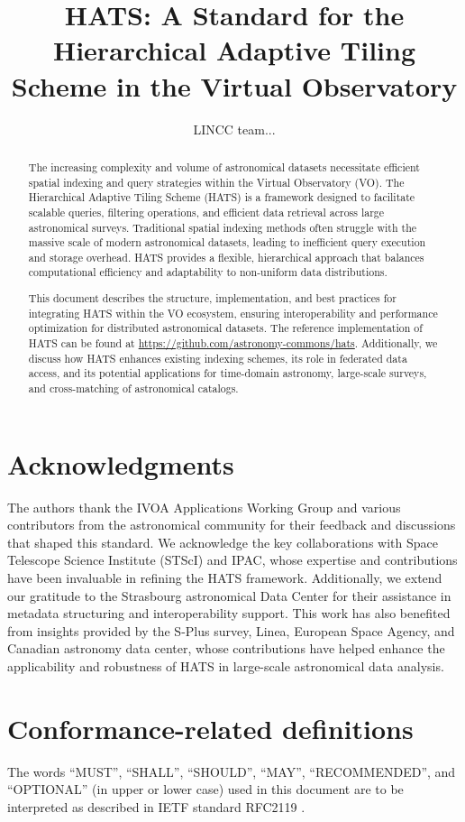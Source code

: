 \documentclass[11pt,a4paper]{ivoa}
\title{HATS: A Standard for the Hierarchical Adaptive Tiling Scheme in the Virtual Observatory}
\author[https://www.ivoa.net/authors/offline]{LINCC team...}
\begin{document}
\begin{abstract}
    The increasing complexity and volume of astronomical datasets necessitate efficient spatial indexing and query strategies within the Virtual Observatory (VO). The Hierarchical Adaptive Tiling Scheme (HATS) is a framework designed to facilitate scalable queries, filtering operations, and efficient data retrieval across large astronomical surveys. Traditional spatial indexing methods often struggle with the massive scale of modern astronomical datasets, leading to inefficient query execution and storage overhead. HATS provides a flexible, hierarchical approach that balances computational efficiency and adaptability to non-uniform data distributions.

    This document describes the structure, implementation, and best practices for integrating HATS within the VO ecosystem, ensuring interoperability and performance optimization for distributed astronomical datasets. The reference implementation of HATS can be found at \url{https://github.com/astronomy-commons/hats}. Additionally, we discuss how HATS enhances existing indexing schemes, its role in federated data access, and its potential applications for time-domain astronomy, large-scale surveys, and cross-matching of astronomical catalogs.
\end{abstract}

\section*{Acknowledgments}
    The authors thank the IVOA Applications Working Group and various contributors from the astronomical community for their feedback and discussions that shaped this standard. We acknowledge the key collaborations with Space Telescope Science Institute (STScI) and IPAC, whose expertise and contributions have been invaluable in refining the HATS framework. Additionally, we extend our gratitude to  the Strasbourg astronomical Data Center for their assistance in metadata structuring and interoperability support. This work has also benefited from insights provided by the S-Plus survey, Linea, European Space Agency, and Canadian astronomy data center, whose contributions have helped enhance the applicability and robustness of HATS in large-scale astronomical data analysis.


\section*{Conformance-related definitions}
The words ``MUST'', ``SHALL'', ``SHOULD'', ``MAY'', ``RECOMMENDED'', and
``OPTIONAL'' (in upper or lower case) used in this document are to be
interpreted as described in IETF standard RFC2119 \citep{std:RFC2119}.
\end{document}
